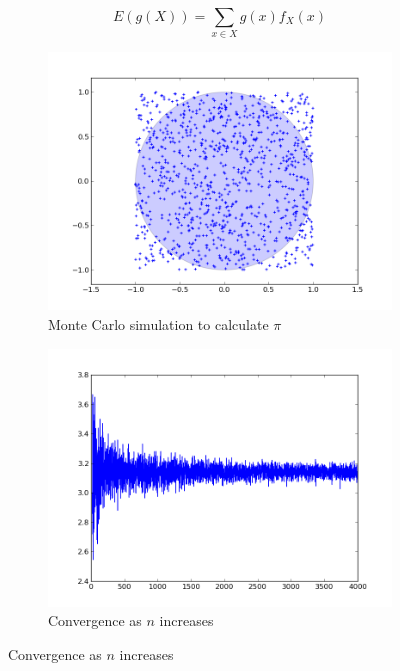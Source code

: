 \begin{equation}
E\left(g\left(X\right)\right) = \sum\limits_{x \in X} g\left(x\right)f_X\left(x\right)
\end{equation}

\begin{figure}[h]
	\centering
	\begin{subfigure}{0.45\textwidth}
		\includegraphics[width=\textwidth]{./images/circle.png}
	\caption{Monte Carlo simulation to calculate $\pi$}
	\end{subfigure}
	\begin{subfigure}{0.45\textwidth}
		\includegraphics[width=\textwidth]{./images/converge.png}
	\caption{Convergence as $n$ increases}
	\end{subfigure}
\end{figure}

